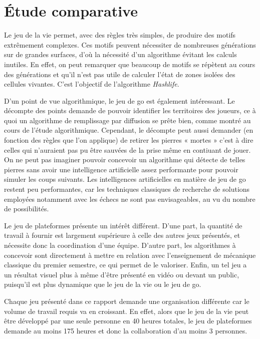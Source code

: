 \chapter*{Étude comparative}

Le jeu de la vie permet, avec des règles très simples, de produire
des motifs extrêmement complexes. Ces motifs peuvent nécessiter de
nombreuses générations sur de grandes surfaces, d'où la nécessité
d'un algorithme évitant les calculs inutiles. En effet, on peut
remarquer que beaucoup de motifs se répètent au cours des générations
et qu'il n'est pas utile de calculer l'état de zones isolées
des cellules vivantes. C'est l'objectif de l'algorithme \emph{Hashlife}.

D'un point de vue algorithmique, le jeu de go est également
intéressant. Le décompte des points demande de pouvoir identifier
les territoires des joueurs, ce à quoi un algorithme de remplissage par
diffusion se prête bien, comme montré au cours de l'étude algorithmique.
Cependant, le décompte peut aussi demander (en fonction
des règles que l'on applique) de retirer les pierres « mortes »
c'est à dire celles qui n'auraient pas pu être sauvées
de la prise même en contiuant de jouer. On ne peut pas imaginer pouvoir
concevoir un algorithme qui détecte de telles pierres sans avoir
une intelligence artificielle assez performante pour pouvoir simuler
les coups suivants. Les intelligences artificielles en matière
de jeu de go restent peu performantes, car les techniques
classiques de recherche de solutions employées notamment avec
les échecs ne sont pas envisageables, au vu du nombre de possibilités.

Le jeu de plateformes présente un intérêt différent. D'une part,
la quantité de travail à fournir est largement supérieure à celle des autres
jeux présentés, et nécessite donc la coordination d'une équipe.
D'autre part, les algorithmes à concevoir sont directement
à mettre en relation avec l'enseignement de mécanique classique du
premier semestre, ce qui permet de le valoriser. Enfin, un tel jeu
a un résultat visuel plus à même d'être présenté en vidéo ou
devant un public, puisqu'il est plus dynamique que le jeu de la
vie ou le jeu de go.

Chaque jeu présenté dans ce rapport demande une organisation différente car le
volume de travail requis va en croissant. En effet, alors que le jeu de la vie
peut être développé par une seule personne en 40 heures totales, le jeu de
plateformes demande au moins 175 heures et donc la collaboration d'au moins
3 personnes.

